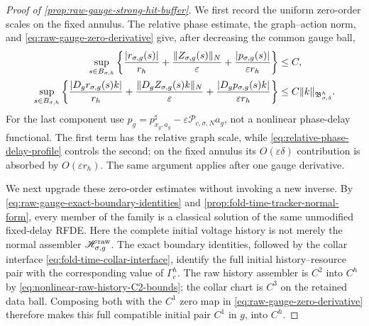 \begin{proof}[Proof of
\cref{prop:raw-gauge-strong-hit-buffer}]
We first record the uniform zero-order scales on the fixed annulus.  The
relative phase estimate, the graph--action norm, and
\cref{eq:raw-gauge-zero-derivative} give, after decreasing the common
gauge ball,
\begin{align}
 \sup_{s\in B_{\sigma,h}}
 \left\{
  \frac{|r_{\sigma,g}(s)|}{r_h}
 +\frac{\|Z_{\sigma,g}(s)\|_N}{\varepsilon}
 +\frac{|p_{\sigma,g}(s)|}{\varepsilon r_h}
 \right\}&\le C,\notag\\
 \sup_{s\in B_{\sigma,h}}
 \left\{
  \frac{|D_gr_{\sigma,g}(s)k|}{r_h}
 +\frac{\|D_gZ_{\sigma,g}(s)k\|_N}{\varepsilon}
 +\frac{|D_gp_{\sigma,g}(s)k|}{\varepsilon r_h}
 \right\}&\le C\|k\|_{\mathfrak B_{\sigma,\delta}^h}.
                                                        \label{eq:proof-strong-hit-zero-scales}
\end{align}
For the last component use
\(p_g=p_{x_g,a_g}^\sharp
 -\varepsilon\mathscr P_{c,\sigma,N}a_g\), not a nonlinear phase-delay
functional.  The first term has the relative graph scale, while
\cref{eq:relative-phase-delay-profile} controls the second; on the fixed
annulus its \(O(\varepsilon\delta)\) contribution is absorbed by
\(O(\varepsilon r_h)\).  The same argument applies after one gauge
derivative.

We next upgrade these zero-order estimates without invoking a new inverse.
By \cref{eq:raw-gauge-exact-boundary-identities} and
\cref{prop:fold-time-tracker-normal-form}, every member of the family is a
classical solution of the same unmodified fixed-delay RFDE.  Here the
complete initial voltage history is not merely the normal assembler
\(\mathscr H_{\sigma,g}^{\rm raw}\).  The exact boundary identities,
followed by the collar interface
\cref{eq:fold-time-collar-interface}, identify the full initial
history--resource pair with the corresponding value of \(\Gamma_e^h\).
The raw history assembler is \(C^2\) into \(C^h\) by
\cref{eq:nonlinear-raw-history-C2-bounds}; the collar chart is \(C^3\) on
the retained data ball.  Composing both with the \(C^1\) zero map in
\cref{eq:raw-gauge-zero-derivative} therefore makes this full compatible
initial pair \(C^1\) in \(g\), into \(C^h\).


\end{proof}
